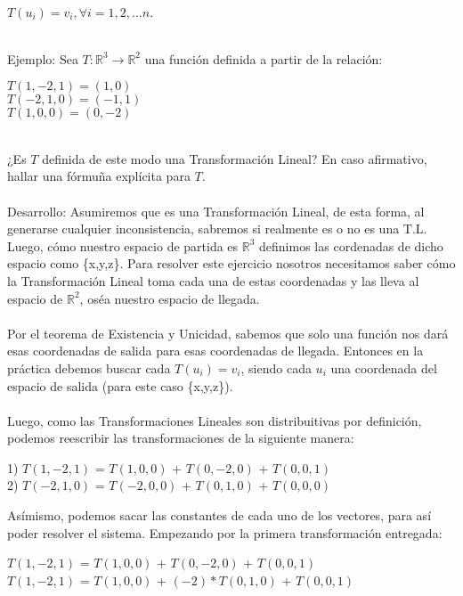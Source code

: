 \documentclass[12pt]{article}
\begin{document}
\begin{center}
	$T(u_i) = v_i, \forall i = 1, 2, ... n.$
\end{center}
\\
Ejemplo: Sea $T : \mathbb{R}^3 \to \mathbb{R}^2$ una función definida a partir de la
relación:

\begin{center}
$T(1,-2,1) = (1,0)$
\\
$T(-2,1,0) = (-1,1)$
\\
$T(1,0,0) = (0,-2)$
\\
\end{center}
\\
¿Es $T$ definida de este modo una Transformación Lineal? En caso afirmativo, hallar
una fórmuña explícita para $T$.
\\
\\
Desarrollo: Asumiremos que es una Transformación Lineal, de esta forma, al generarse 
cualquier inconsistencia, sabremos si realmente es o no es una T.L. Luego, cómo nuestro 
espacio de partida es $\mathbb{R}^3$ definimos las cordenadas de dicho espacio como 
\{x,y,z\}. Para resolver este ejercicio nosotros necesitamos saber cómo la Transformación 
Lineal toma cada una de estas coordenadas y las lleva al espacio de $\mathbb{R}^2$, oséa 
nuestro espacio de llegada.
\\\\
Por el teorema de Existencia y Unicidad, sabemos que solo una función nos dará esas
coordenadas de salida para esas coordenadas de llegada. Entonces en la práctica debemos
buscar cada $T(u_i) = v_i$, siendo cada $u_i$ una coordenada del espacio de salida (para
este caso \{x,y,z\}).
\\\\
Luego, como las Transformaciones Lineales son distribuitivas por definición, podemos
reescribir las transformaciones de la siguiente manera:
\begin{center}
	1) $T(1,-2,1)$ = $T(1,0,0)$ + $T(0,-2,0)$ + $T(0,0,1)$ \\
	2) $T(-2,1,0)$ = $T(-2,0,0)$ + $T(0,1,0)$ + $T(0,0,0)$
\end{center}
Asímismo, podemos sacar las constantes de cada uno de los vectores, para así poder resolver
el sistema. Empezando por la primera transformación entregada:
\begin{center}
	$T(1,-2,1)$ = $T(1,0,0)$ + $T(0,-2,0)$ + $T(0,0,1)$ \\
	$T(1,-2,1)$ = $T(1,0,0)$ + $(-2)*T(0,1,0)$ + $T(0,0,1)$
\end{center}
\end{document}
